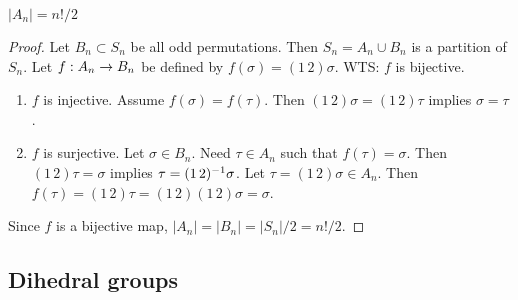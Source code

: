 \documentclass[]{article}
\begin{document}
\begin{proposition}
	$|A_n| = n!/2$
\end{proposition}
\begin{proof}
	Let $B_n\subset S_n$ be all odd permutations. Then $S_n = A_n\cup B_n$ is a partition of $S_n$. Let $f: A_n\rightarrow B_n$ be defined by $f(\sigma) = (1\,2)\sigma$.
	WTS: $f$ is bijective.
	\begin{enumerate}
		\item $f$ is injective. Assume $f(\sigma) = f(\tau)$. Then $(1\,2)\sigma = (1\,2)\tau$ implies $\sigma = \tau$.
		\item $f$ is surjective. Let $\sigma\in B_n$. Need $\tau\in A_n$ such that $f(\tau) = \sigma$. Then $(1\,2)\tau = \sigma$ implies $\tau = (1\,2)^{-1}\sigma$. Let $\tau = (1\,2)\sigma\in A_n$. Then $f(\tau) = (1\,2)\tau = (1\,2)(1\,2)\sigma = \sigma$.
	\end{enumerate}
	Since $f$ is a bijective map, $|A_n| = |B_n| = |S_n|/2 = n!/2$.
\end{proof}

\subsection{Dihedral groups}
\end{document}
